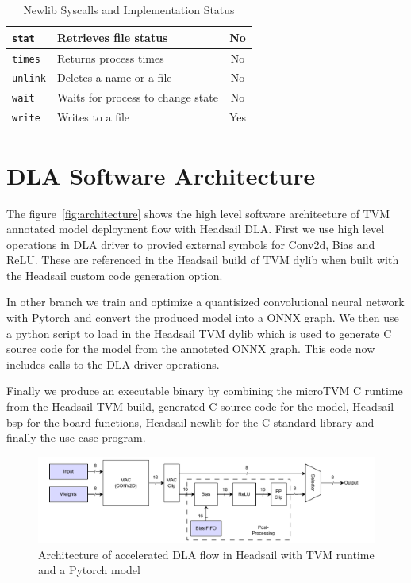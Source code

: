\documentclass[12pt,a4paper,english
]{tunithesis}
\begin{document}
\begin{table}[htbp]
\begin{tabular}{|l|l|c|}
\texttt{stat}          & Retrieves file status              & No                       \\ \hline
\texttt{times}         & Returns process times              & No                       \\ \hline
\texttt{unlink}        & Deletes a name or a file           & No                       \\ \hline
\texttt{wait}          & Waits for process to change state  & No                       \\ \hline
\texttt{write}         & Writes to a file                   & Yes                       \\ \hline
\end{tabular}
\caption{Newlib Syscalls and Implementation Status}
\label{tab:newlib_syscalls}
\end{table}



\section{DLA Software Architecture}
The figure~\ref{fig:architecture} shows the high level software architecture of TVM annotated model deployment flow with Headsail DLA. First we use high level operations in DLA driver to provied external symbols for Conv2d, Bias and ReLU. These are referenced in the Headsail build of TVM dylib when built with the Headsail custom code generation option.

In other branch we train and optimize a quantisized convolutional neural network with Pytorch and convert the produced model into a ONNX graph.
We then use a python script to load in the Headsail TVM dylib which is used to generate C source code for the model from the annoteted ONNX graph. This code now includes calls to the DLA driver operations.

Finally we produce an executable binary by combining the microTVM C runtime from the Headsail TVM build, generated C source code for the model, Headsail-bsp for the board functions, Headsail-newlib for the C standard library and finally the use case program.

\begin{figure}
  \centering
  \includegraphics[width=\linewidth]{img/dla-internal.pdf}
  \caption{Architecture of accelerated DLA flow in Headsail with TVM runtime and a Pytorch model}
  \label{fig:dla_internal}
\end{figure}
\end{document}
